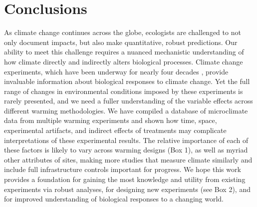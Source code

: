 \documentclass{article}
\begin{document}
\section* {Conclusions}
\par As climate change continues across the globe, ecologists are challenged to not only document impacts, but also make quantitative, robust predictions. Our ability to meet this challenge requires a nuanced mechanistic understanding of how climate directly and indirectly alters biological processes. Climate change experiments, which have been underway for nearly four decades \citep[e.g.,][]{tamaki1981,carlson1982,melillo2017}, provide invaluable information about biological responses to climate change. Yet the full range of changes in environmental conditions imposed by these experiments is rarely presented, and we need a fuller understanding of the variable effects across different warming methodologies. We have compiled a database of microclimate data from multiple warming experiments and shown how time, space, experimental artifacts, and indirect effects of treatments may complicate interpretations of these experimental results. The relative importance of each of these factors is likely to vary across warming designs (Box 1), as well as myriad other attributes of sites, making more studies that measure climate similarly and include full infrastructure controls important for progress. 
We hope this work provides a foundation for gaining the most knowledge and utility from existing experiments via robust analyses, for designing new experiments (see Box 2), and for improved understanding of biological responses to a changing world.
\end{document}
